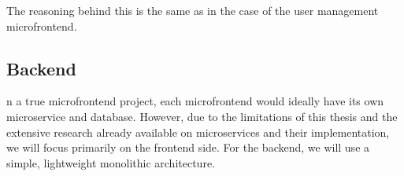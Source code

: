 \noindent
The reasoning behind this is the same as in the case of the user management microfrontend.

\subsection{Backend}
n a true microfrontend project, each microfrontend would ideally have its own microservice and database. However, due to the limitations of this thesis and the extensive research already available on microservices and their implementation, we will focus primarily on the frontend side. For the backend, we will use a simple, lightweight monolithic architecture.